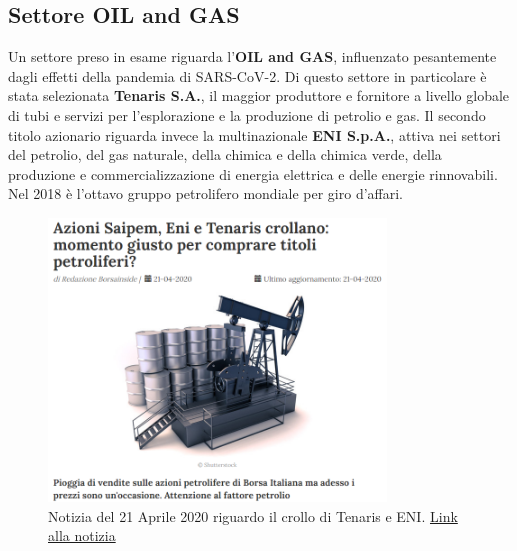 \documentclass[12pt]{article}
\begin{document}
\subsection{Settore OIL and GAS}
Un settore preso in esame riguarda l'\textbf{OIL and GAS}, influenzato pesantemente dagli effetti della pandemia di SARS-CoV-2. Di questo settore in particolare è stata selezionata \textbf{Tenaris S.A.}, il maggior produttore e fornitore a livello globale di tubi e servizi per l'esplorazione e la produzione di petrolio e gas. Il secondo titolo azionario riguarda invece la multinazionale \textbf{ENI S.p.A.}, attiva nei settori del petrolio, del gas naturale, della chimica e della chimica verde, della produzione e commercializzazione di energia elettrica e delle energie rinnovabili. Nel 2018 è l'ottavo gruppo petrolifero mondiale per giro d'affari.
\begin{figure}[!htb]
    \centering
    \includegraphics[width=0.8\textwidth]{immagini/eni_ten_news.png}
    \caption{Notizia del 21 Aprile 2020 riguardo il crollo di Tenaris e ENI. \href{https://www.borsainside.com/mercati_italiani/73074-azioni-saipem-eni-tenaris-crollo-momento-giusto-comprare-titoli-petroliferi/}{Link alla notizia}}
\end{figure}
\FloatBarrier
\end{document}
